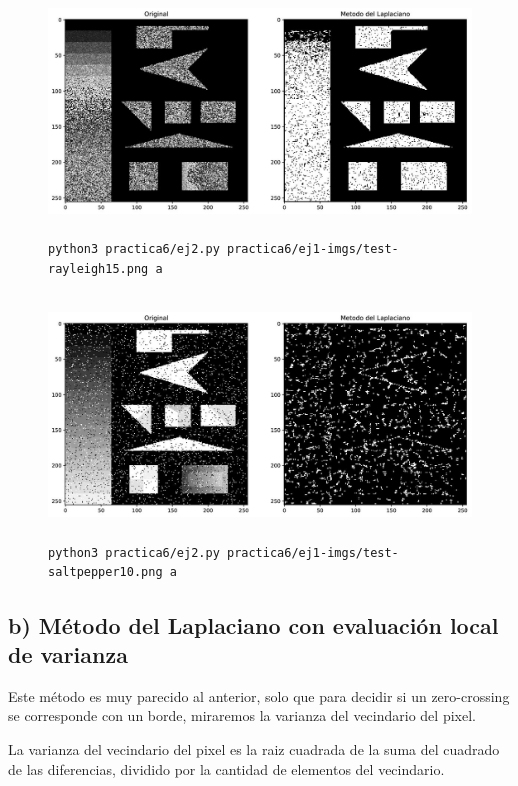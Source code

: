 \documentclass[11pt, spanish]{article}
\begin{document}
\begin{figure}[H]
\centering
    \includegraphics[height=6.5cm]{informe-imgs/ej2-a-test-rayleigh15.jpg}
    \caption{\texttt{python3 practica6/ej2.py practica6/ej1-imgs/test-rayleigh15.png a}}
\end{figure}

\begin{figure}[H]
\centering
    \includegraphics[height=6.5cm]{informe-imgs/ej2-a-test-saltpepper10.jpg}
    \caption{\texttt{python3 practica6/ej2.py practica6/ej1-imgs/test-saltpepper10.png a}}
\end{figure}


\newpage
\subsection{b) Método del Laplaciano con evaluación local de varianza}

Este método es muy parecido al anterior, solo que para decidir si un zero-crossing se corresponde con un borde, miraremos la varianza del vecindario del pixel.

La varianza del vecindario del pixel es la raiz cuadrada de la suma del cuadrado de las diferencias, dividido por la cantidad de elementos del vecindario.
\end{document}
